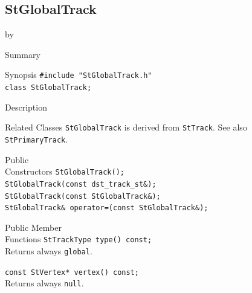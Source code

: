 \documentclass[twoside]{article}
\newcommand{\entrylabel}[1]{\mbox{\textbf{{#1}}}\hfil}%
\newenvironment{entry}
{\begin{list}{}%
    {\renewcommand{\makelabel}{\entrylabel}%
     \setlength{\labelwidth}{90pt}%
     \setlength{\leftmargin}{\labelwidth}
     \advance\leftmargin by \labelsep%
      }%
    }%
  {\end{list}}
\newcommand{\Entrylabel}[1]%
{\raisebox{0pt}[1ex][0pt]{\makebox[\labelwidth][l]%
    {\parbox[t]{\labelwidth}{\hspace{0pt}\textbf{{#1}}}}}}
\newenvironment{Entry}%
{\renewcommand{\entrylabel}{\Entrylabel}\begin{entry}}%
  {\end{entry}}
\begin{document}
\subsection{StGlobalTrack}
\label{sec:StGlobalTrack}
\begin{Entry}
\item[Summary]
\item[Synopsis]
    \verb+#include "StGlobalTrack.h"+\\
    \verb+class StGlobalTrack;+\\
\item[Description]
\item[Related Classes] \texttt{StGlobalTrack} is derived from
    \texttt{StTrack}. See also \texttt{StPrimaryTrack}.
    
\item[Public\\ Constructors]
    \verb+StGlobalTrack();+\\
    \verb+StGlobalTrack(const dst_track_st&);+\\
    \verb+StGlobalTrack(const StGlobalTrack&);+\\
    \verb+StGlobalTrack& operator=(const StGlobalTrack&);+\\
\item[Public Member\\ Functions]
    \verb+StTrackType type() const;+\\
    Returns always \texttt{global}.

    \verb+const StVertex* vertex() const;+\\
    Returns always \texttt{null}.
\end{Entry}
\clearpage
\end{document}
